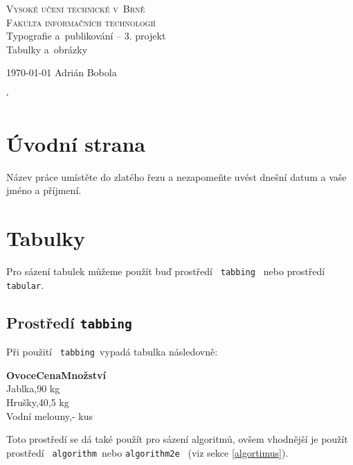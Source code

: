 \documentclass[11pt,a4paper]{article}
\begin{document}
\begin{titlepage}
\begin{center}
\Huge\textsc{Vysoké učení technické v~Brně}\\
\huge\textsc{Fakulta informačních technologií}\\
\LARGE{Typografie a~publikování -- 3. projekt}\\
\Huge{Tabulky a~obrázky}
\end{center}
{\Large{\today\hfill
Adrián Bobola}}
\end{titlepage}
\catcode`

\section{Úvodní strana}
Název práce umístěte do zlatého řezu a nezapomeňte uvést dnešní datum a vaše jméno a příjmení.

\section{Tabulky}
Pro sázení tabulek můžeme použít buď prostředí \verb| tabbing | nebo prostředí \verb| tabular|.

\subsection{Prostředí \texttt{tabbing}}
Při použití \verb| tabbing |vypadá tabulka následovně:

\begin{tabbing}
    {\textbf{Ovoce}}\hspace{1.8cm}\={\textbf{Cena}}\hspace{0.5cm}\={\textbf{Množství}}\\
    Jablka,90 kg\\
    Hrušky,40,5 kg\\
    Vodní melouny,- kus\\
\end{tabbing}
Toto prostředí se dá také použít pro sázení algoritmů, ovšem vhodnější je použít 
prostředí \verb| algorithm |nebo \verb|algorithm2e | (viz sekce \ref{algortimus}).
\end{document}
